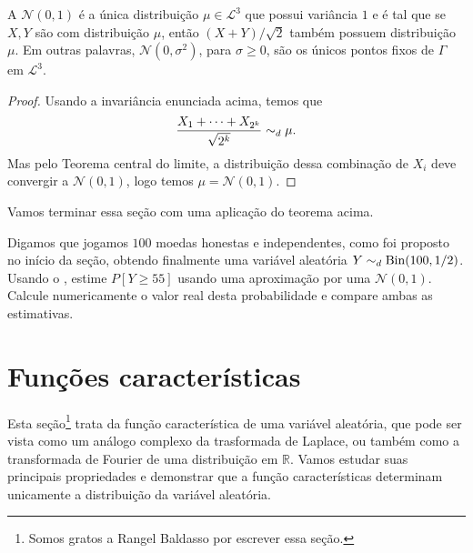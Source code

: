 \begin{corollary}
  A $\mathcal{N}(0,1)$ é a única distribuição $\mu \in \mathcal{L}^3$ que possui variância $1$ e é tal que se $X, Y$ são \iid com distribuição $\mu$, então $(X + Y)/\sqrt{2}$ também possuem distribuição $\mu$.
  Em outras palavras, $\mathcal{N}(0, \sigma^2)$, para $\sigma \geq 0$, são os únicos pontos fixos de $\Gamma$ em $\mathcal{L}^3$.
\end{corollary}

\begin{proof}
  Usando a invariância enunciada acima, temos que
  \begin{equation}
    \frac{X_1 + \dots + X_{2^k}}{\sqrt{2^k}} \sim_d \mu.
  \end{equation}
  Mas pelo Teorema central do limite, a distribuição dessa combinação de $X_i$ deve convergir a $\mathcal{N}(0,1)$, logo temos $\mu = \mathcal{N}(0,1)$.
\end{proof}

Vamos terminar essa seção com uma aplicação do teorema acima.

\begin{exercise}
  Digamos que jogamos $100$ moedas honestas e independentes, como foi proposto no início da seção, obtendo finalmente uma variável aleatória $Y \sim_d \operatorname{Bin}(100, 1/2)$.
  Usando o , estime $P[Y \geq 55]$ usando uma aproximação por uma $\mathcal{N}(0,1)$.
  Calcule numericamente o valor real desta probabilidade e compare ambas as estimativas.
\end{exercise}


\section{Funções características}




Esta seção\footnote{Somos gratos a Rangel Baldasso por escrever essa seção.} trata da função característica de uma variável aleatória, que pode ser vista como um análogo complexo da trasformada de Laplace, ou também como a transformada de Fourier de uma distribuição em $\mathbb{R}$.
   Vamos estudar suas principais propriedades e demonstrar que a função características determinam unicamente a distribuição da variável aleatória.

